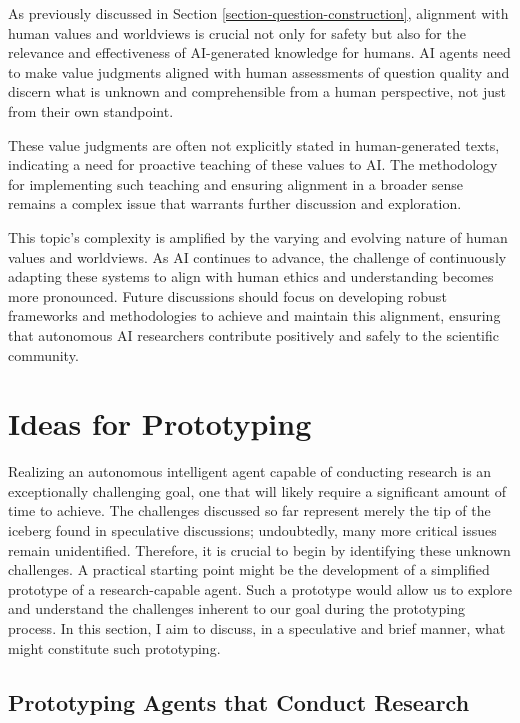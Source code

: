 \documentclass{article}
\begin{document}
As previously discussed in Section \ref{section-question-construction}, alignment with human values and worldviews is crucial not only for safety but also for the relevance and effectiveness of AI-generated knowledge for humans. AI agents need to make value judgments aligned with human assessments of question quality and discern what is unknown and comprehensible from a human perspective, not just from their own standpoint.

These value judgments are often not explicitly stated in human-generated texts, indicating a need for proactive teaching of these values to AI. The methodology for implementing such teaching and ensuring alignment in a broader sense remains a complex issue that warrants further discussion and exploration.

This topic's complexity is amplified by the varying and evolving nature of human values and worldviews. As AI continues to advance, the challenge of continuously adapting these systems to align with human ethics and understanding becomes more pronounced. Future discussions should focus on developing robust frameworks and methodologies to achieve and maintain this alignment, ensuring that autonomous AI researchers contribute positively and safely to the scientific community.

\section{Ideas for Prototyping}
Realizing an autonomous intelligent agent capable of conducting research is an exceptionally challenging goal, one that will likely require a significant amount of time to achieve. The challenges discussed so far represent merely the tip of the iceberg found in speculative discussions; undoubtedly, many more critical issues remain unidentified. Therefore, it is crucial to begin by identifying these unknown challenges. A practical starting point might be the development of a simplified prototype of a research-capable agent. Such a prototype would allow us to explore and understand the challenges inherent to our goal during the prototyping process. In this section, I aim to discuss, in a speculative and brief manner, what might constitute such prototyping.

\subsection{Prototyping Agents that Conduct Research}
\end{document}
